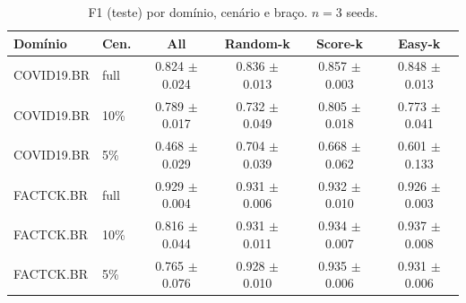 \documentclass[conference]{IEEEtran}
\begin{document}
\begin{table}[t]
\caption{F1 (teste) por dom\'inio, cen\'ario e bra\c{c}o. $n{=}3$ seeds.}\label{tab:f1}
\centering
\begin{tabular}{llcccc}
\toprule
Dom\'inio & Cen. & All & Random-k & Score-k & Easy-k \\
\midrule
COVID19.BR & full & 0.824 $\pm$ 0.024 & 0.836 $\pm$ 0.013 & 0.857 $\pm$ 0.003 & 0.848 $\pm$ 0.013 \\
COVID19.BR & 10\% & 0.789 $\pm$ 0.017 & 0.732 $\pm$ 0.049 & 0.805 $\pm$ 0.018 & 0.773 $\pm$ 0.041 \\
COVID19.BR & 5\% & 0.468 $\pm$ 0.029 & 0.704 $\pm$ 0.039 & 0.668 $\pm$ 0.062 & 0.601 $\pm$ 0.133 \\
FACTCK.BR & full & 0.929 $\pm$ 0.004 & 0.931 $\pm$ 0.006 & 0.932 $\pm$ 0.010 & 0.926 $\pm$ 0.003 \\
FACTCK.BR & 10\% & 0.816 $\pm$ 0.044 & 0.931 $\pm$ 0.011 & 0.934 $\pm$ 0.007 & 0.937 $\pm$ 0.008 \\
FACTCK.BR & 5\% & 0.765 $\pm$ 0.076 & 0.928 $\pm$ 0.010 & 0.935 $\pm$ 0.006 & 0.931 $\pm$ 0.006 \\
\bottomrule
\end{tabular}
\end{table}
\end{document}
